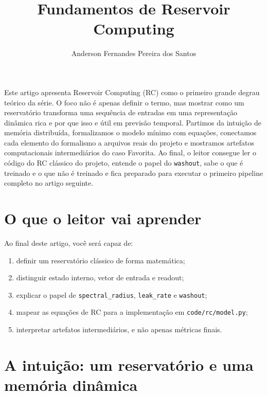 \documentclass[12pt]{article}
\title{Fundamentos de Reservoir Computing}
\author{Anderson Fernandes Pereira dos Santos}
\providecommand{\tightlist}{%
              \setlength{\itemsep}{0pt}\setlength{\parskip}{0pt}}
\begin{document}
            \maketitle

            \begin{resumo}
            Este artigo apresenta Reservoir Computing (RC) como o primeiro grande degrau teórico da série. O foco não é apenas definir o termo, mas mostrar como um reservatório transforma uma sequência de entradas em uma representação dinâmica rica e por que isso e útil em previsão temporal. Partimos da intuição de memória distribuída, formalizamos o modelo mínimo com equações, conectamos cada elemento do formalismo a arquivos reais do projeto e mostramos artefatos computacionais intermediários do caso Favorita. Ao final, o leitor consegue ler o código do RC clássico do projeto, entende o papel do \texttt{washout}, sabe o que é treinado e o que não é treinado e fica preparado para executar o primeiro pipeline completo no artigo seguinte.
            \end{resumo}

            \section{O que o leitor vai aprender}\label{1-o-que-o-leitor-vai-aprender}

Ao final deste artigo, você será capaz de:

\begin{enumerate}
\def\labelenumi{\arabic{enumi}.}
\tightlist
\item
  definir um reservatório clássico de forma matemática;
\item
  distinguir estado interno, vetor de entrada e readout;
\item
  explicar o papel de \texttt{spectral\_radius}, \texttt{leak\_rate} e \texttt{washout};
\item
  mapear as equações de RC para a implementação em \texttt{code/rc/model.py};
\item
  interpretar artefatos intermediários, e não apenas métricas finais.
\end{enumerate}

\section{A intuição: um reservatório e uma memória dinâmica}\label{2-a-intuiuxe7uxe3o-um-reservatuxf3rio-e-uma-memuxf3ria-dinuxe2mica}
\end{document}
